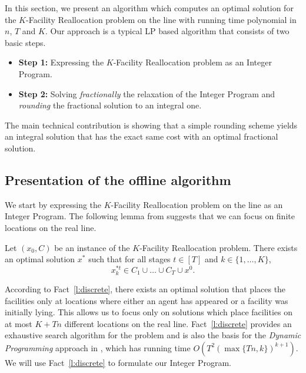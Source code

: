 In this section, we present an algorithm which computes an optimal solution for the $K$-Facility 
Reallocation problem on the line with running time polynomial in  $n$, $T$ and $K$. Our approach is a typical LP based algorithm that consists of two basic steps.

\begin{itemize}
 \item \textbf{Step 1:} Expressing the $K$-Facility Reallocation problem as an Integer Program.
 \item \textbf{Step 2:} Solving \emph{fractionally} the relaxation of the  Integer Program and 
 \emph{rounding} the fractional solution to an integral one.
\end{itemize}

The main technical contribution is showing that a simple rounding 
scheme yields an integral solution
that has the exact same cost with an optimal
fractional solution.


\subsection{Presentation of the offline algorithm}
We start by expressing the $K$-Facility Reallocation problem on the line as 
an Integer Program. The following lemma from \cite{KW2018} suggests that we can focus on finite locations on the real line.




\begin{fact} \label{l:discrete}
Let $(x_0,C)$ be an instance of the $K$-Facility Reallocation problem.
There exists an optimal solution $x^*$ such that for all stages
$t \in [T]$ and $k \in \{1, \ldots ,K\}$,
\[x_k^{*t} \in C_1 \cup \ldots \cup C_T \cup x^0 .\]
\end{fact}

According to Fact~\ref{l:discrete}, there exists an optimal solution that places 
the facilities only at locations where either an agent has appeared or a facility 
was initially lying. This allows us to focus only on solutions which place facilities on at most $K+Tn$ different locations on the real line.
Fact~\ref{l:discrete} provides an exhaustive search algorithm for the problem 
and is also the basis
for the \emph{Dynamic Programming} approach in \cite{KW2018}, which has running time $O(T^2(\max \{Tn,k \})^{k+1})$. We will use 
Fact~\ref{l:discrete} to formulate our Integer Program.




